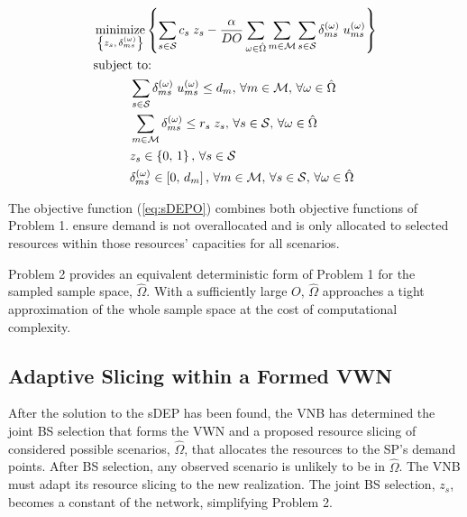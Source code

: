 \documentclass[conference]{IEEEtran}
\DeclareMathOperator*{\argmin}{minimize}
\begin{document}
\begin{tcolorbox}[floatplacement = !ht, float, title = Problem 2: Sampled DEP (sDEP)]
\begin{align}
& \argmin_{\left\{ z_s,\, \delta_{ms}^{\left( \omega \right)} \right\}} \left\{ \sum_{s \in \mathcal{S}} c_s \; z_s - \frac{\alpha}{DO} \sum_{\omega \in \hat{\Omega}} \sum_{m \in \mathcal{M}} \sum_{s \in \mathcal{S}} \delta_{ms}^{\left( \omega \right)} \; u_{ms}^{\left( \omega \right)} \right\} \label{eq:sDEPO} \\
& \text{subject to:}  \nonumber \\
& \hspace{0.4in} \sum_{s \in \mathcal{S}} \delta_{ms}^{\left( \omega \right)} \; u_{ms}^{\left( \omega \right)} \leq d_m,\, \forall m \in \mathcal{M},\, \forall \omega \in \hat{\Omega} \label{eq:sDEPC1} \\
& \hspace{0.4in} \sum_{m \in \mathcal{M}} \delta_{ms}^{\left( \omega \right)} \leq r_s \; z_s,\, \forall s \in \mathcal{S},\, \forall \omega \in \hat{\Omega} \label{eq:sDEPC2} \\
& \hspace{0.4in} z_s \in \left\{ 0,\, 1 \right\},\, \forall s \in \mathcal{S} \label{eq:sDEPC3} \\
& \hspace{0.4in} \delta_{ms}^{\left( \omega \right)} \in \left[ 0,\, d_m \right],\, \forall m \in \mathcal{M},\, \forall s \in \mathcal{S},\, \forall \omega \in \hat{\Omega} \label{eq:sDEPC4}
\end{align}
\end{tcolorbox}

The objective function (\cref{eq:sDEPO}) combines both objective functions of Problem 1.   ensure demand is not overallocated and is only allocated to selected resources within those resources' capacities for all scenarios.

Problem 2 provides an equivalent deterministic form of Problem 1 for the sampled sample space, $\hat{\Omega}$.  With a sufficiently large $O$, $\hat{\Omega}$ approaches a tight approximation of the whole sample space at the cost of computational complexity.

\subsection{Adaptive Slicing within a Formed VWN} \label{subsec:slice}

After the solution to the sDEP has been found, the VNB has determined the joint BS selection that forms the VWN and a proposed resource slicing of considered possible scenarios, $\hat{\Omega}$, that allocates the resources to the SP's demand points.  After BS selection, any observed scenario is unlikely to be in $\hat{\Omega}$.  The VNB must adapt its resource slicing to the new realization.  The joint BS selection, $z_s$, becomes a constant of the network, simplifying Problem 2.
\end{document}
